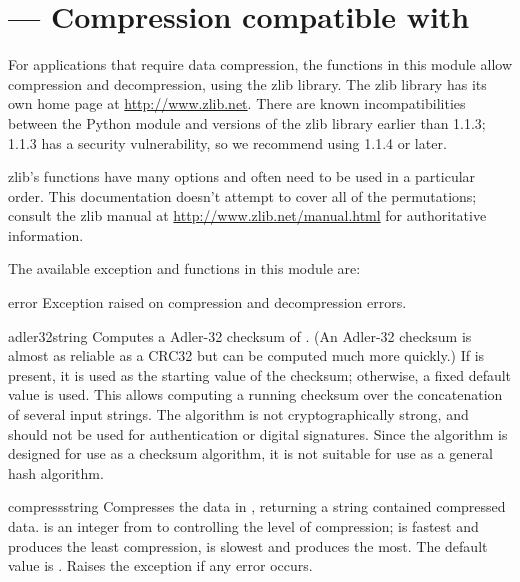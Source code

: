 \section{ ---
         Compression compatible with }



For applications that require data compression, the functions in this
module allow compression and decompression, using the zlib library.
The zlib library has its own home page at \url{http://www.zlib.net}.  
There are known incompatibilities between the Python module and
versions of the zlib library earlier than 1.1.3; 1.1.3 has a security
vulnerability, so we recommend using 1.1.4 or later.

zlib's functions have many options and often need to be used in a
particular order.  This documentation doesn't attempt to cover all of
the permutations; consult the zlib manual at
\url{http://www.zlib.net/manual.html} for authoritative information.

The available exception and functions in this module are:

\begin{excdesc}{error}
  Exception raised on compression and decompression errors.
\end{excdesc}


\begin{funcdesc}{adler32}{string}
   Computes a Adler-32 checksum of .  (An Adler-32
   checksum is almost as reliable as a CRC32 but can be computed much
   more quickly.)  If  is present, it is used as the
   starting value of the checksum; otherwise, a fixed default value is
   used.  This allows computing a running checksum over the
   concatenation of several input strings.  The algorithm is not
   cryptographically strong, and should not be used for
   authentication or digital signatures.  Since the algorithm is
   designed for use as a checksum algorithm, it is not suitable for
   use as a general hash algorithm.
\end{funcdesc}

\begin{funcdesc}{compress}{string}
  Compresses the data in , returning a string contained
  compressed data.   is an integer from  to
   controlling the level of compression;  is fastest
  and produces the least compression,  is slowest and produces
  the most.  The default value is .  Raises the
   exception if any error occurs.
\end{funcdesc}

